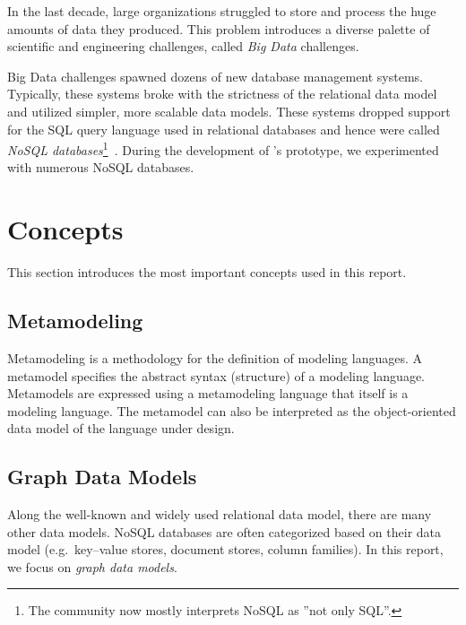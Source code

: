 In the last decade, large organizations struggled to store and process the huge amounts of data they produced. This problem introduces a diverse palette of scientific and engineering challenges, called \emph{Big Data} challenges. 

Big Data challenges spawned dozens of new database management systems. Typically, these systems broke with the strictness of the relational data model and utilized simpler, more scalable data models. These systems dropped support for the SQL query language used in relational databases and hence were called \emph{NoSQL databases}\footnote{The community now mostly interprets NoSQL as ''not only SQL''.}~\cite{NoSQL}. During the development of \iqd{}'s prototype, we experimented with numerous NoSQL databases.


\section{Concepts}

This section introduces the most important concepts used in this report. %


\subsection{Metamodeling}

Metamodeling is a methodology for the definition of modeling languages. A metamodel specifies the abstract syntax (structure) of a modeling language. Metamodels are expressed using a metamodeling language that itself is a modeling language. The metamodel can also be interpreted as the object-oriented data model of the language under design.

\subsection{Graph Data Models}

Along the well-known and widely used relational data model, there are many other data models. NoSQL databases are often categorized based on their data model (e.g.\ key--value stores, document stores, column families). In this report, we focus on \emph{graph data models}. %

